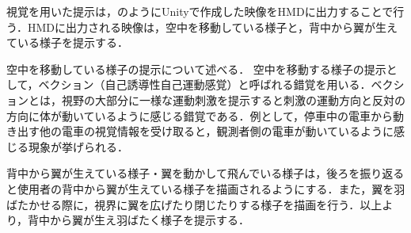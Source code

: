        視覚を用いた提示は，のようにUnityで作成した映像をHMDに出力することで行う．HMDに出力される映像は，空中を移動している様子と，背中から翼が生えている様子を提示する．

        空中を移動している様子の提示について述べる．
        空中を移動する様子の提示として，ベクション（自己誘導性自己運動感覚）と呼ばれる錯覚を用いる．ベクションとは，視野の大部分に一様な運動刺激を提示すると刺激の運動方向と反対の方向に体が動いているように感じる錯覚である\cite{妹尾武治2014ベクションとその周辺の近年の動向}．例として，停車中の電車から動き出す他の電車の視覚情報を受け取ると，観測者側の電車が動いているように感じる現象が挙げられる．

        背中から翼が生えている様子・翼を動かして飛んでいる様子は，後ろを振り返ると使用者の背中から翼が生えている様子を描画されるようにする．また，翼を羽ばたかせる際に，視界に翼を広げたり閉じたりする様子を描画を行う．以上より，背中から翼が生え羽ばたく様子を提示する．



